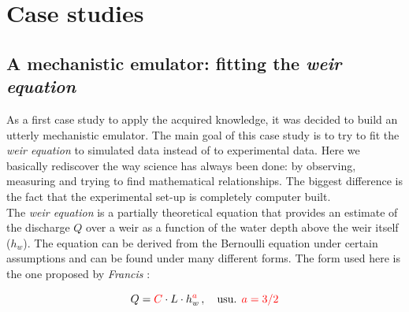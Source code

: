 \chapter{Case studies}
\label{chp:case_studies}

\section{A mechanistic emulator: fitting the \emph{weir equation}}


As a first case study to apply the acquired knowledge, it was decided to build an utterly mechanistic emulator.
The main goal of this case study is to try to fit the \emph{weir equation} to simulated data instead of to experimental data.
Here we basically rediscover the way science has always been done: by observing, measuring and trying to find mathematical relationships.
The biggest difference is the fact that the experimental set-up is completely computer built.\\

The \emph{weir equation} is a partially theoretical equation that provides an estimate of the discharge $Q$ over a weir as a function of the water depth above the weir itself ($h_w$).
The equation can be derived from the Bernoulli equation under certain assumptions \autocite{bos_discharge_1989} and can be found under many different forms.
The form used here is the one proposed by \emph{Francis} \autocite{walcott_weir_1907}:

\begin{equation}\label{eq:weir_eq}
  Q = \textcolor{red}{C} \cdot L \cdot h_w^{\textcolor{red}{a}}\, , \quad \mbox{usu. } \textcolor{red}{a = 3/2}
\end{equation}

